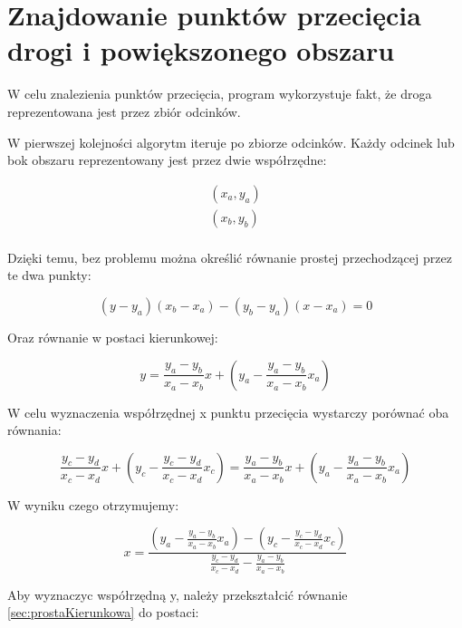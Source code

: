 \newpage
\section{Znajdowanie punktów przecięcia drogi i powiększonego obszaru}
\label{sec:ZnajdowaniePunktówPrzecięciaDrogiIPowiększonegoObszaru}
W celu znalezienia punktów przecięcia, program wykorzystuje fakt, że droga reprezentowana jest przez zbiór odcinków.

W pierwszej kolejności algorytm iteruje po zbiorze odcinków. Każdy odcinek lub bok obszaru reprezentowany jest przez dwie współrzędne:

\begin{equation}
\begin{split}
(x_a, y_a) \\
(x_b, y_b) \\
\end{split}
\end{equation}

Dzięki temu, bez problemu można określić równanie prostej przechodzącej przez te dwa punkty:

\begin{equation}
(y - y_a) (x_b-x_a) - (y_b - y_a) (x - x_a) = 0
\end{equation}

Oraz równanie w postaci kierunkowej:

\begin{equation} \label{sec:prostaKierunkowa}
y=\frac{y_a - y_b}{x_a - x_b}x + (y_a - \frac{y_a - y_b}{x_a - x_b}x_a)
\end{equation}

W celu wyznaczenia współrzędnej x punktu przecięcia wystarczy porównać oba równania:

\begin{equation}
\frac{y_c - y_d}{x_c - x_d}x + (y_c - \frac{y_c - y_d}{x_c - x_d}x_c)=\frac{y_a - y_b}{x_a - x_b}x + (y_a - \frac{y_a - y_b}{x_a - x_b}x_a)
\end{equation}

W wyniku czego otrzymujemy:

\begin{equation}
x = \frac{(y_a - \frac{y_a - y_b}{x_a - x_b}x_a) - (y_c - \frac{y_c - y_d}{x_c - x_d}x_c)}{\frac{y_c - y_d}{x_c - x_d} - \frac{y_a - y_b}{x_a - x_b}}
\end{equation}

Aby wyznaczyc współrzędną y, należy przekształcić równanie \ref{sec:prostaKierunkowa} do postaci:

